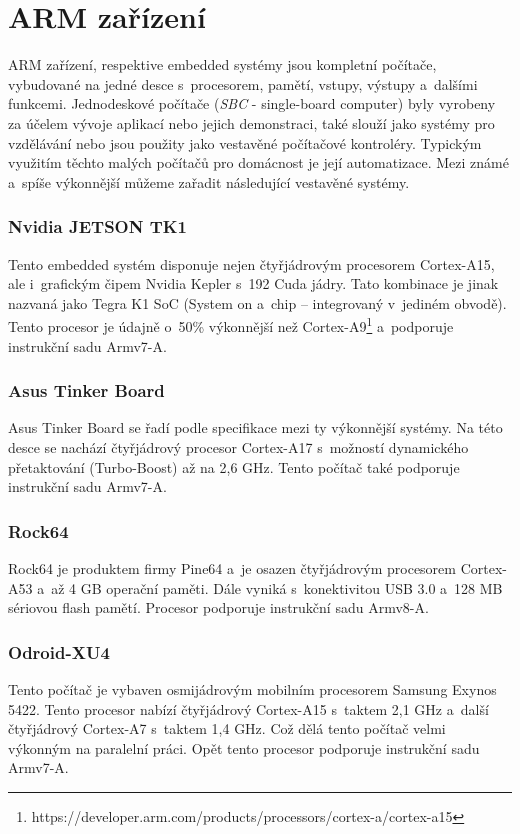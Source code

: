 \section{ARM zařízení}
ARM zařízení, respektive embedded systémy jsou kompletní počítače, vybudované na jedné desce s~procesorem, pamětí, vstupy, výstupy a~dalšími funkcemi. Jednodeskové počítače (\textit{SBC} - single-board computer) byly vyrobeny za účelem vývoje aplikací nebo jejich demonstraci, také slouží jako systémy pro vzdělávání nebo jsou použity jako vestavěné počítačové kontroléry. Typickým využitím těchto malých počítačů pro domácnost je její automatizace. 
Mezi známé a~spíše výkonnější můžeme zařadit následující vestavěné systémy.

\subsubsection*{Nvidia JETSON TK1}
Tento embedded systém disponuje nejen čtyřjádrovým procesorem Cortex-A15, ale i~grafickým čipem Nvidia Kepler s~192 Cuda jádry. Tato kombinace je jinak nazvaná jako Tegra K1 SoC (System on a~chip – integrovaný v~jediném obvodě). Tento procesor je údajně o~50\% výkonnější než Cortex-A9\footnote{https://developer.arm.com/products/processors/cortex-a/cortex-a15} a~podporuje instrukční sadu Armv7-A.

\subsubsection*{Asus Tinker Board}
Asus Tinker Board se řadí podle specifikace mezi ty výkonnější systémy. Na této desce se nachází čtyřjádrový procesor Cortex-A17 s~možností dynamického přetaktování (Turbo-Boost) až na 2,6 GHz. Tento počítač také podporuje instrukční sadu Armv7-A.  

\subsubsection*{Rock64}
Rock64 je produktem firmy Pine64 a~je osazen čtyřjádrovým procesorem Cortex-A53 a~až 4 GB operační paměti. Dále vyniká s~konektivitou USB 3.0 a~128 MB sériovou flash pamětí. Procesor podporuje instrukční sadu Armv8-A.

\subsubsection*{Odroid-XU4}
Tento počítač je vybaven osmijádrovým mobilním procesorem Samsung Exynos 5422. Tento procesor nabízí čtyřjádrový Cortex-A15 s~taktem 2,1 GHz a~další čtyřjádrový Cortex-A7 s~taktem 1,4 GHz. Což dělá tento počítač velmi výkonným na paralelní práci. Opět tento procesor podporuje instrukční sadu Armv7-A.

